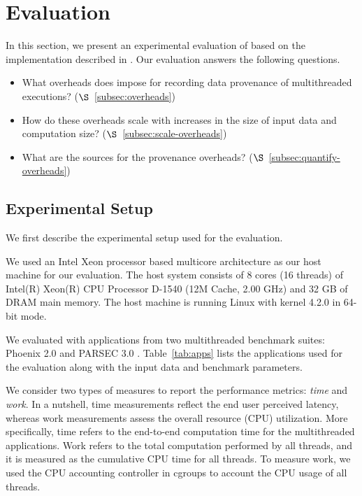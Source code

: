 \section{Evaluation}
\label{sec:evaluation}

In this section, we present an experimental evaluation of \projecttitle based on the implementation described in  . Our evaluation answers the following questions.

\begin{itemize}
\item What overheads does \projecttitle impose for recording data provenance of multithreaded executions? ($\S$~\ref{subsec:overheads})
\item How do these overheads scale with increases in the size of input data and computation size? ($\S$~\ref{subsec:scale-overheads})
\item What are the sources for the provenance overheads? ($\S$~\ref{subsec:quantify-overheads})
\end{itemize}



\subsection{Experimental Setup}
We first describe the experimental setup used for the evaluation.

 We used an Intel Xeon processor based
multicore architecture as our host machine for our evaluation. The
host system consists of 8 cores (16 threads) of Intel(R) Xeon(R) CPU Processor D-1540
(12M Cache, 2.00 GHz) and 32 GB of DRAM main memory. The host
machine is running Linux with kernel 4.2.0 in 64-bit mode.


  We evaluated \projecttitle with applications from two multithreaded benchmark suites: Phoenix 2.0 \cite{phoenix} and PARSEC 3.0 \cite{parsec}. Table~\ref{tab:apps} lists the applications used for the evaluation along with the input data and benchmark parameters.





  We consider two types of measures to report the performance metrics: {\em time} and {\em work}. In a nutshell, time measurements reflect the end user perceived latency, whereas work measurements assess the overall resource (CPU) utilization.  More specifically,  time refers to the end-to-end computation time for the multithreaded applications. Work refers to the total computation performed by all threads, and it is measured as the cumulative CPU time for all threads. To measure work, we used the CPU accounting controller in cgroups to account the CPU usage of all threads.

